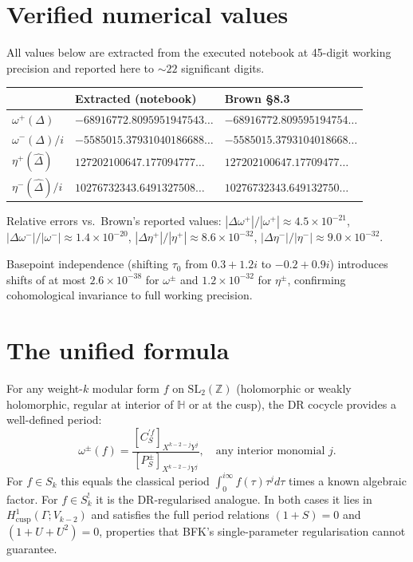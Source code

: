 \documentclass[11pt,letterpaper]{article}
\newcommand{\HH}{\mathbb{H}}
\newcommand{\ZZ}{\mathbb{Z}}
\newcommand{\SLZ}{\mathrm{SL}_2(\ZZ)}
\newcommand{\Dhat}{\widehat{\Delta}}
\begin{document}
\section{Verified numerical values}

All values below are extracted from the executed notebook at 45-digit working
precision and reported here to $\sim 22$ significant digits.

\begin{center}
\begin{tabular}{lll}
\toprule
& \textbf{Extracted (notebook)} & \textbf{Brown \cite{Brown2017} \S8.3} \\
\midrule
$\omega^+(\Delta)$
  & $-68916772.8095951947543\ldots$
  & $-68916772.809595194754\ldots$ \\
$\omega^-(\Delta)/i$
  & $-5585015.37931040186688\ldots$
  & $-5585015.3793104018668\ldots$ \\[4pt]
$\eta^+(\Dhat)$
  & $127202100647.177094777\ldots$
  & $127202100647.17709477\ldots$ \\
$\eta^-(\Dhat)/i$
  & $10276732343.6491327508\ldots$
  & $10276732343.649132750\ldots$ \\
\bottomrule
\end{tabular}
\end{center}

Relative errors vs.\ Brown's reported values:
$|\Delta\omega^+|/|\omega^+| \approx 4.5\times 10^{-21}$,
$|\Delta\omega^-|/|\omega^-| \approx 1.4\times 10^{-20}$,
$|\Delta\eta^+|/|\eta^+| \approx 8.6\times 10^{-32}$,
$|\Delta\eta^-|/|\eta^-| \approx 9.0\times 10^{-32}$.

Basepoint independence (shifting $\tau_0$ from $0.3+1.2i$ to $-0.2+0.9i$)
introduces shifts of at most $2.6\times 10^{-38}$ for $\omega^\pm$ and
$1.2\times 10^{-32}$ for $\eta^\pm$, confirming cohomological invariance to
full working precision.

\section{The unified formula}

For any weight-$k$ modular form $f$ on $\SLZ$ (holomorphic or weakly holomorphic,
regular at interior of $\HH$ or at the cusp), the DR cocycle provides a
well-defined period:
\begin{equation}\label{eq:unified}
  \omega^\pm(f)
  = \frac{[C^{\prime f}_S]_{X^{k-2-j}Y^j}}{[P^\pm_S]_{X^{k-2-j}Y^j}},
  \quad\text{any interior monomial } j.
\end{equation}
For $f \in S_k$ this equals the classical period $\int_0^{i\infty} f(\tau)\tau^j d\tau$
times a known algebraic factor.  For $f \in S_k^!$ it is the DR-regularised
analogue.  In both cases it lies in $H^1_{\mathrm{cusp}}(\Gamma; V_{k-2})$ and
satisfies the full period relations $(1+S)=0$ and $(1+U+U^2)=0$, properties that
BFK's single-parameter regularisation cannot guarantee.
\end{document}
